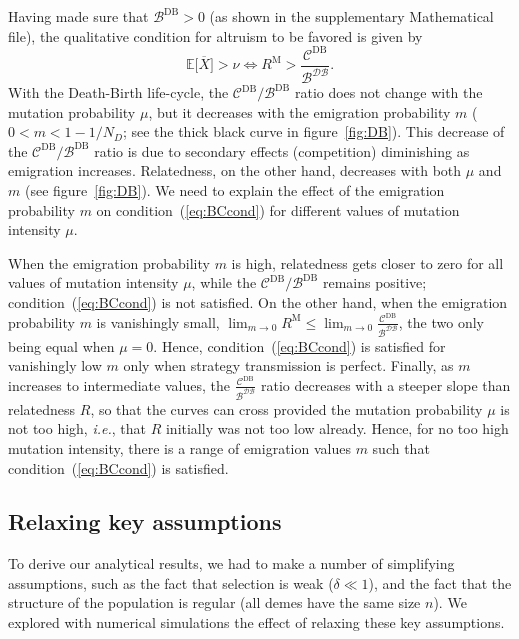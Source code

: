 \documentclass[11pt, letterpaper]{article}
\newcommand{\eqrefnoeq}[1]{(\ref{#1})}
\newcommand{\ie}{\textit{i.e.}}
\newcommand{\Esp}[1]{\mathbb{E}\big[ #1\big]}%
\newcommand{\Moran}{\textrm{M}}
\newcommand{\DB}{\textrm{DB}}
\newcommand{\mutbias}{\nu}
\newcommand{\ndemes}{N_D}
\newcommand{\selstr}{\delta}
\begin{document}
Having made sure that $\mathcal{B}^{\DB}>0$ (as shown in the supplementary Mathematical file), the qualitative condition for altruism to be favored is given by 
\begin{equation}\label{eq:BCcond}
\Esp{\overline{X}} > \mutbias \Leftrightarrow R^{\Moran} > \frac{\mathcal{C}^{\DB}}{\mathcal{B^{\DB}}}.
\end{equation}
%
With the Death-Birth life-cycle, the $\mathcal{C}^{\DB}/\mathcal{B}^{\DB}$ ratio does not change with the mutation probability $\mu$, but it decreases with the emigration probability $m$ ($0<m<1-1/\ndemes$; see the thick black curve in figure~\ref{fig:DB}). This decrease of the $\mathcal{C}^{\DB}/\mathcal{B}^{\DB}$ ratio is due to secondary effects (competition) diminishing as emigration increases. Relatedness, on the other hand, decreases with both $\mu$ and $m$ (see figure~\ref{fig:DB}). We need to explain the effect of the emigration probability $m$ on condition~\eqrefnoeq{eq:BCcond} for different values of mutation intensity $\mu$. 

When the emigration probability $m$ is high, relatedness gets closer to zero for all values of mutation intensity $\mu$, while the $\mathcal{C}^{\DB}/\mathcal{B}^{\DB}$ remains positive; condition~\eqrefnoeq{eq:BCcond} is not satisfied. On the other hand, when the emigration probability $m$ is vanishingly small, $\lim_{m\to 0} R^{\Moran} \leq \lim_{m\to 0} \frac{\mathcal{C}^{\DB}}{\mathcal{B^{\DB}}}$, the two only being equal when $\mu=0$. Hence, condition~\eqrefnoeq{eq:BCcond} is satisfied for vanishingly low $m$ only when strategy transmission is perfect. Finally, as $m$ increases to intermediate values, the $\frac{\mathcal{C}^{\DB}}{\mathcal{B^{\DB}}}$ ratio decreases with a steeper slope than relatedness $R$, so that the curves can cross provided the mutation probability $\mu$ is not too high, \ie, that $R$ initially was not too low already. Hence, for no too high mutation intensity,  there is a range of emigration values $m$ such that condition~\eqrefnoeq{eq:BCcond} is satisfied.



\subsection*{Relaxing key assumptions}

To derive our analytical results, we had to make a number of simplifying assumptions, such as the fact that selection is weak ($\selstr \ll 1$), and the fact that the structure of the population is regular (all demes have the same size $n$). We explored with numerical simulations the effect of relaxing these key assumptions. 
\end{document}
